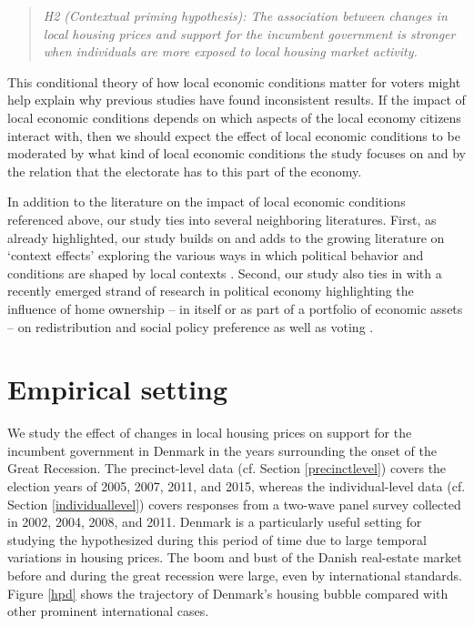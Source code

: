 \documentclass[12pt,a4paper]{article}
\begin{document}
	\newcommand{\htwo}{the contextual priming hypothesis}
	
	\begin{quote}
		\textit{H2 (Contextual priming hypothesis): The association between changes in local housing prices and support for the incumbent government is stronger when individuals are more exposed to local housing market activity.}
	\end{quote}
	
	This conditional theory of how local economic conditions matter for voters might help explain why previous studies have found inconsistent results. If the impact of local economic conditions depends on which aspects of the local economy citizens interact with, then we should expect the effect of local economic conditions to be moderated by what kind of local economic conditions the study focuses on and by the relation that the electorate has to this part of the economy.
	
	In addition to the literature on the impact of local economic conditions referenced above, our study ties into several neighboring literatures. First, as already highlighted, our study builds on and adds to the growing literature on `context effects' exploring the various ways in which political behavior and conditions are shaped by local contexts \citep[e.g.,][]{hopkins2010politicized,Enos2016}. Second, our study also ties in with a recently emerged strand of research in political economy highlighting the influence of home ownership -- in itself or as part of a portfolio of economic assets -- on redistribution and social policy preference as well as voting \citep{ansell2014political,nadeau2010patrimonial,stubager2013reaching}.
	
	\section{Empirical setting}
	
	We study the effect of changes in local housing prices on support for the incumbent government in Denmark in the years surrounding the onset of the Great Recession. The precinct-level data (cf. Section \ref{precinctlevel}) covers the election years of 2005, 2007, 2011, and 2015, whereas the individual-level data (cf. Section \ref{individuallevel}) covers responses from a two-wave panel survey collected in 2002, 2004, 2008, and 2011. Denmark is a particularly useful setting for studying the hypothesized during this period of time due to large temporal variations in housing prices. The boom and bust of the Danish real-estate market before and during the great recession were large, even by international standards. Figure \ref{hpd} shows the trajectory of Denmark's housing bubble compared with other prominent international cases.
	
\end{document}
